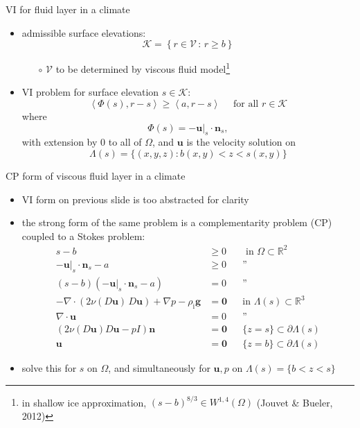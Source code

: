 \documentclass[svgnames,
               hyperref={colorlinks,citecolor=DeepPink4,linkcolor=FireBrick,urlcolor=Maroon},
               usepdftitle=false]  %
               {beamer}
\newcommand{\RR}{\mathbb{R}}
\newcommand{\bn}{\mathbf{n}}
\newcommand{\bu}{\mathbf{u}}
\newcommand{\bzero}{\bm{0}}
\newcommand{\rhoi}{\rho_{\text{i}}}
\newcommand{\ip}[2]{\left<#1,#2\right>}
\begin{document}
\begin{frame}{VI for fluid layer in a climate}

\begin{itemize}
\item admissible surface elevations:
    $$\mathcal{K} = \left\{r \in \mathcal{V} \,:\, r \ge b\right\}$$

    \begin{itemize}
    \item[$\circ$] $\mathcal{V}$ to be determined by viscous fluid model\footnote{in shallow ice approximation, $(s-b)^{8/3} \in W^{1,4}(\Omega)$ (Jouvet \& Bueler, 2012)}
    \end{itemize}
\item VI problem for surface elevation $s\in\mathcal{K}$:
	$$\ip{\Phi(s)}{r-s} \ge \ip{a}{r-s} \quad \text{ for all } r \in \mathcal{K}$$
where
    $$\Phi(s)=- \bu|_s \cdot \bn_s,$$
with extension by 0 to all of $\Omega$, and $\bu$ is the velocity solution on
    $$\Lambda(s) = \{(x,y,z) : b(x,y) < z < s(x,y)\}$$
\end{itemize}
\end{frame}


\begin{frame}{CP form of viscous fluid layer in a climate}

\begin{itemize}
\item VI form on previous slide is too abstracted for clarity
\item the strong form of the same problem is a \alert{complementarity problem (CP) coupled to a Stokes problem}:
\begin{align*}
s - b &\ge 0 && \text{ in $\Omega \subset \RR^2$} \\
- \bu|_s \cdot \bn_s - a &\ge 0 && \text{''} \\
(s-b)(- \bu|_s \cdot \bn_s - a) &= 0 && \text{''} \\
- \nabla \cdot \left(2 \nu(D\bu)\, D\bu\right) + \nabla p - \rhoi \mathbf{g} &= \bzero && \text{in $\Lambda(s) \subset \RR^3$} \\
\nabla \cdot \bu &= 0 && \text{''} \\
\left(2 \nu(D\bu) D\bu - pI\right) \bn &= \bzero && \{z=s\} \subset \partial \Lambda(s) \\
\bu &= \bzero && \{z=b\} \subset \partial \Lambda(s)
\end{align*}
\item solve this for $s$ on $\Omega$, and simultaneously for $\bu,p$ on $\Lambda(s) = \{b < z < s\}$
\end{itemize}
\end{frame}
\end{document}
